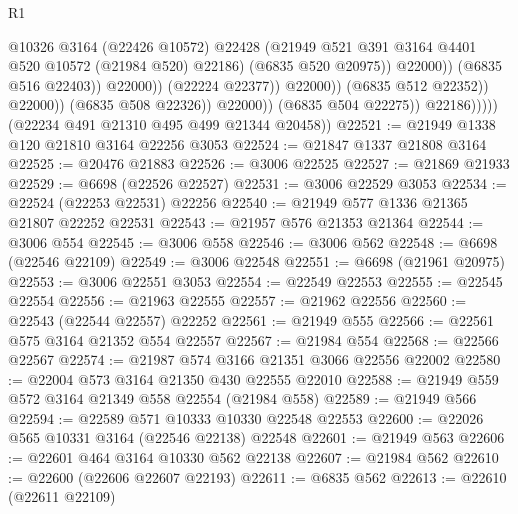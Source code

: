 \begin{lexlean}{R1}
\begin{coremodule}
                                                @10326
                                                @3164
                                                (@22426 @10572)
                                                @22428
                                                (@21949
                                                  @521
                                                  @391
                                                  @3164
                                                  @4401
                                                  @520
                                                  @10572
                                                  (@21984 @520)
                                                  @22186)
                                                (@6835 @520 @20975))
                                              @22000))
                                          (@6835 @516 @22403))
                                        @22000))
                                    (@22224 @22377))
                                  @22000))
                              (@6835 @512 @22352))
                            @22000))
                        (@6835 @508 @22326))
                      @22000))
                  (@6835 @504 @22275))
                @22186)))))
      (@22234 @491 @21310 @495 @499 @21344 @20458))
@22521 := @21949 @1338 @120 @21810 @3164 @22256 @3053
@22524 := @21847 @1337 @21808 @3164
@22525 := @20476 @21883
@22526 := @3006 @22525
@22527 := @21869 @21933
@22529 := @6698 (@22526 @22527)
@22531 := @3006 @22529 @3053
@22534 := @22524 (@22253 @22531) @22256
@22540 := @21949 @577 @1336 @21365 @21807 @22252 @22531
@22543 := @21957 @576 @21353 @21364
@22544 := @3006 @554
@22545 := @3006 @558
@22546 := @3006 @562
@22548 := @6698 (@22546 @22109)
@22549 := @3006 @22548
@22551 := @6698 (@21961 @20975)
@22553 := @3006 @22551 @3053
@22554 := @22549 @22553
@22555 := @22545 @22554
@22556 := @21963 @22555
@22557 := @21962 @22556
@22560 := @22543 (@22544 @22557) @22252
@22561 := @21949 @555
@22566 := @22561 @575 @3164 @21352 @554 @22557
@22567 := @21984 @554
@22568 := @22566 @22567
@22574 := @21987 @574 @3166 @21351 @3066 @22556 @22002
@22580 := @22004 @573 @3164 @21350 @430 @22555 @22010
@22588 := @21949 @559 @572 @3164 @21349 @558 @22554 (@21984 @558)
@22589 := @21949 @566
@22594 := @22589 @571 @10333 @10330 @22548 @22553
@22600 := @22026 @565 @10331 @3164 (@22546 @22138) @22548
@22601 := @21949 @563
@22606 := @22601 @464 @3164 @10330 @562 @22138
@22607 := @21984 @562
@22610 := @22600 (@22606 @22607 @22193)
@22611 := @6835 @562
@22613 := @22610 (@22611 @22109)

\end{coremodule}
\end{lexlean}
